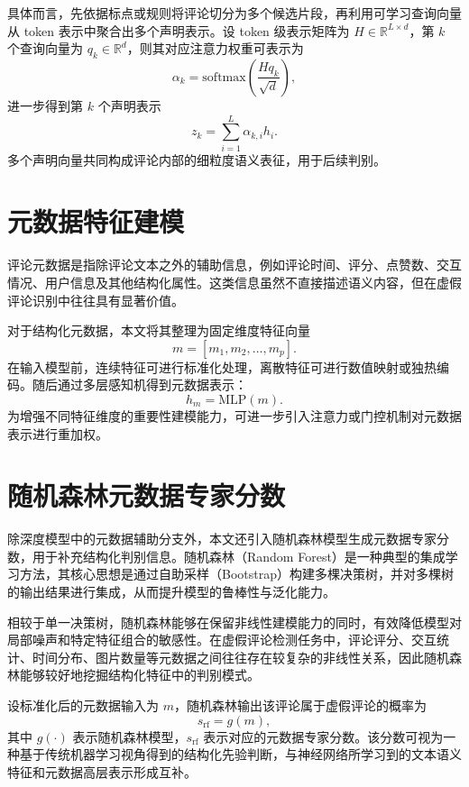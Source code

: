 \documentclass[UTF8,oneside,openright,fontset=none]{ctexbook}
\numberwithin{equation}{chapter}
\begin{document}
具体而言，先依据标点或规则将评论切分为多个候选片段，再利用可学习查询向量从 token 表示中聚合出多个声明表示。设 token 级表示矩阵为 $H\in\mathbb{R}^{L\times d}$，第 $k$ 个查询向量为 $q_k\in\mathbb{R}^{d}$，则其对应注意力权重可表示为
\begin{equation}
  \alpha_k = \mathrm{softmax}\left(\frac{Hq_k}{\sqrt{d}}\right),
\end{equation}
进一步得到第 $k$ 个声明表示
\begin{equation}
  z_k = \sum_{i=1}^{L} \alpha_{k,i} h_i.
\end{equation}
多个声明向量共同构成评论内部的细粒度语义表征，用于后续判别。

\section{元数据特征建模}
评论元数据是指除评论文本之外的辅助信息，例如评论时间、评分、点赞数、交互情况、用户信息及其他结构化属性。这类信息虽然不直接描述语义内容，但在虚假评论识别中往往具有显著价值。

对于结构化元数据，本文将其整理为固定维度特征向量
\begin{equation}
  m = [m_1,m_2,\ldots,m_p].
\end{equation}
在输入模型前，连续特征可进行标准化处理，离散特征可进行数值映射或独热编码。随后通过多层感知机得到元数据表示：
\begin{equation}
  h_m = \mathrm{MLP}(m).
\end{equation}
为增强不同特征维度的重要性建模能力，可进一步引入注意力或门控机制对元数据表示进行重加权。

\section{随机森林元数据专家分数}
除深度模型中的元数据辅助分支外，本文还引入随机森林模型生成元数据专家分数，用于补充结构化判别信息。随机森林（Random Forest）是一种典型的集成学习方法，其核心思想是通过自助采样（Bootstrap）构建多棵决策树，并对多棵树的输出结果进行集成，从而提升模型的鲁棒性与泛化能力。

相较于单一决策树，随机森林能够在保留非线性建模能力的同时，有效降低模型对局部噪声和特定特征组合的敏感性。在虚假评论检测任务中，评论评分、交互统计、时间分布、图片数量等元数据之间往往存在较复杂的非线性关系，因此随机森林能够较好地挖掘结构化特征中的判别模式。

设标准化后的元数据输入为 $m$，随机森林输出该评论属于虚假评论的概率为
\begin{equation}
  s_{\mathrm{rf}} = g(m),
\end{equation}
其中 $g(\cdot)$ 表示随机森林模型，$s_{\mathrm{rf}}$ 表示对应的元数据专家分数。该分数可视为一种基于传统机器学习视角得到的结构化先验判断，与神经网络所学习到的文本语义特征和元数据高层表示形成互补。
\end{document}
